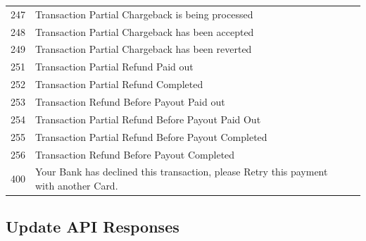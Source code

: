 \documentclass{article}
\newcommand{\cmark}{\ding{51}}
\newcommand{\xmark}{\ding{55}}
\begin{document}
\begin{longtable}{||c|p{7.5cm}||c||c||}
247 &Transaction Partial Chargeback is being processed& \textcolor{green}{\cmark} & \textcolor{green}{\cmark} \\
248 &Transaction Partial Chargeback has been accepted& \textcolor{green}{\cmark} & \textcolor{green}{\cmark} \\
249 &Transaction Partial Chargeback has been reverted& \textcolor{green}{\cmark} & \textcolor{green}{\cmark} \\
251 &Transaction Partial Refund Paid out& \textcolor{green}{\cmark} & \textcolor{green}{\cmark} \\
252 &Transaction Partial Refund Completed& \textcolor{green}{\cmark} & \textcolor{green}{\cmark} \\
253 &Transaction Refund Before Payout Paid out& \textcolor{green}{\cmark} & \textcolor{green}{\cmark} \\
254 &Transaction Partial Refund Before Payout Paid Out& \textcolor{green}{\cmark} & \textcolor{green}{\cmark} \\
255 &Transaction Partial Refund Before Payout Completed& \textcolor{green}{\cmark} & \textcolor{green}{\cmark} \\
256 &Transaction Refund Before Payout Completed& \textcolor{green}{\cmark} & \textcolor{red}{\xmark} \\
400 &Your Bank has declined this transaction, please Retry this payment with another Card.& \textcolor{red}{\xmark} & \textcolor{red}{\xmark} \\
\end{longtable}

\newpage
\subsection{Update API Responses}
\end{document}
